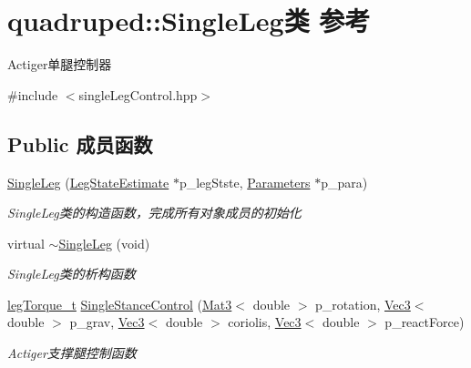 \hypertarget{classquadruped_1_1SingleLeg}{}\section{quadruped\+:\+:Single\+Leg类 参考}
\label{classquadruped_1_1SingleLeg}


Actiger单腿控制器  




{\ttfamily \#include $<$single\+Leg\+Control.\+hpp$>$}

\subsection*{Public 成员函数}
\begin{DoxyCompactItemize}
\item 
\hyperlink{classquadruped_1_1SingleLeg_a3517b91ff7317237d4e7e6713ef31d83}{Single\+Leg} (\hyperlink{classquadruped_1_1LegStateEstimate}{Leg\+State\+Estimate} $\ast$p\+\_\+leg\+Stste, \hyperlink{classquadruped_1_1Parameters}{Parameters} $\ast$p\+\_\+para)
\begin{DoxyCompactList}\small\item\em Single\+Leg类的构造函数，完成所有对象成员的初始化 \end{DoxyCompactList}\item 
\mbox{\label{classquadruped_1_1SingleLeg_af7d1589824b4714abbd3bcfa11099056}} 
virtual \hyperlink{classquadruped_1_1SingleLeg_af7d1589824b4714abbd3bcfa11099056}{$\sim$\+Single\+Leg} (void)
\begin{DoxyCompactList}\small\item\em Single\+Leg类的析构函数 \end{DoxyCompactList}\item 
\hyperlink{structlegTorque__t}{leg\+Torque\+\_\+t} \hyperlink{classquadruped_1_1SingleLeg_a2162ecb433c3583bf3c3ca1289dc9472}{Single\+Stance\+Control} (\hyperlink{cppTypes_8h_adb7d462b35d31f0b2583b3e230a2a2c3}{Mat3}$<$ double $>$ p\+\_\+rotation, \hyperlink{cppTypes_8h_a65c27bf97693676535dd0b30ea0ad399}{Vec3}$<$ double $>$ p\+\_\+grav, \hyperlink{cppTypes_8h_a65c27bf97693676535dd0b30ea0ad399}{Vec3}$<$ double $>$ coriolis, \hyperlink{cppTypes_8h_a65c27bf97693676535dd0b30ea0ad399}{Vec3}$<$ double $>$ p\+\_\+react\+Force)
\begin{DoxyCompactList}\small\item\em Actiger支撑腿控制函数 \end{DoxyCompactList}\item 

\end{DoxyCompactItemize}

